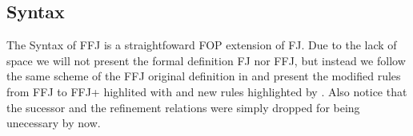
\subsection{Syntax}
The Syntax of \ac{FFJ} is a straightfoward \ac{FOP} extension of \ac{FJ}. Due to the lack
of space we will not present the formal definition \ac{FJ} nor \ac{FFJ}, but instead we follow
the same scheme of the \ac{FFJ} original definition in \cite{apel_feature_2008} and present
the modified rules from \ac{FFJ} to \ac{FFJ+} highlited with  
and new rules highlighted by . Also notice that the sucessor and 
the refinement relations were simply dropped for being unecessary by now.

\newcommand{\cdecl}[6]{\texttt{class #1 extends #2 \{\={#3} \={#4}; #5 \={#6}\}}}
\newcommand{\crefine}[6]{\texttt{refines class #1 \{\={#2} \={#3}; #4 \={#5} \={#6}\}}}
\newcommand{\mdecl}[5]{\texttt{#1 #2 (\={#3} \={#4}) \{return #5;\}}}
\newcommand{\mrefine}[5]{\texttt{refines #1 #2 (\={#3} \={#4}) \{return #5;\}}}

